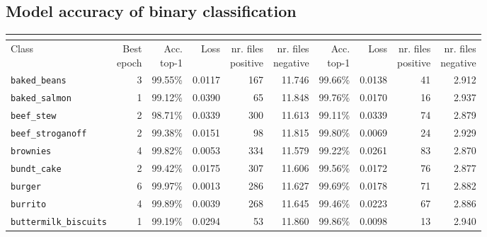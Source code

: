 \documentclass[10pt]{article}
\begin{document}
		\subsection{Model accuracy of binary classification}
			\renewcommand\theadfont{\bfseries}
			\begin{table}[htb]
				\footnotesize
				\centering
				{\def\arraystretch{1}\tabcolsep=5pt
					{\setlength{\extrarowheight}{0.5pt}
						\begin{tabularx}{\linewidth}{ l | r | r r r r | r r r r }
							\hline
							& & \multicolumn{4}{c}{\thead{Training}} & \multicolumn{4}{|c}{\thead{Validation}} \\
							\hline
							\thead[l]{Class\\ \ } & \thead[l]{Best\\ epoch} &
							\thead[l]{Acc.\\ top-1} & \thead[l]{Loss\\ \ } & \thead[l]{nr. files\\ positive} & \thead[l]{nr. files\\ negative} &
							\thead[l]{Acc.\\ top-1} & \thead[l]{Loss\\ \ } & \thead[l]{nr. files\\ positive} & \thead[l]{nr. files\\ negative} \\
							\hline
							\texttt{baked\_beans} & 3 & 99.55\% & 0.0117 & 167 & 11.746 & 99.66\% & 0.0138 & 41 & 2.912 \\
							\texttt{baked\_salmon} & 1 & 99.12\% & 0.0390 & 65 & 11.848 & 99.76\% & 0.0170 & 16 & 2.937 \\
							\texttt{beef\_stew} & 2 & 98.71\% & 0.0339 & 300 & 11.613 & 99.11\% & 0.0339 & 74 & 2.879 \\
							\texttt{beef\_stroganoff} & 2 & 99.38\% & 0.0151 & 98 & 11.815 & 99.80\% & 0.0069 & 24 & 2.929 \\
							\texttt{brownies} & 4 & 99.82\% & 0.0053 & 334 & 11.579 & 99.22\% & 0.0261 & 83 & 2.870 \\
							\texttt{bundt\_cake} & 2 & 99.42\% & 0.0175 & 307 & 11.606 & 99.56\% & 0.0172 & 76 & 2.877 \\
							\texttt{burger} & 6 & 99.97\% & 0.0013 & 286 & 11.627 & 99.69\% & 0.0178 & 71 & 2.882 \\
							\texttt{burrito} & 4 & 99.89\% & 0.0039 & 268 & 11.645 & 99.46\% & 0.0223 & 67 & 2.886 \\
							\texttt{buttermilk\_biscuits} & 1 & 99.19\% & 0.0294 & 53 & 11.860 & 99.86\% & 0.0098 & 13 & 2.940 \\

\end{tabularx}}}
\end{table}
\end{document}

